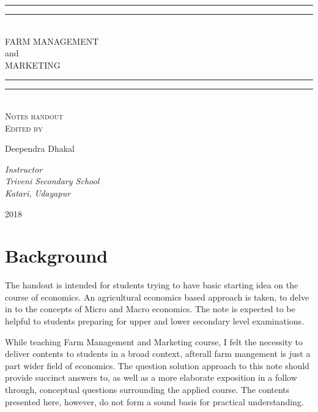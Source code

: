 \documentclass[11pt,]{book}
\title{}
\author{}
\date{}
\newlength{\drop}
\theoremstyle{definition}
\theoremstyle{definition}
\theoremstyle{definition}
\theoremstyle{remark}
\begin{document}
\begin{titlepage}
	\textheight
	\centering
	\vspace*{\baselineskip}
	\rule{\textwidth}{1.6pt}\vspace*{-\baselineskip}\vspace*{2pt}
	\rule{\textwidth}{0.4pt}\\[\baselineskip]
	{\Large FARM MANAGEMENT\\[1.2\baselineskip] and \\[1.2\baselineskip] MARKETING}\\[1.2\baselineskip]
	\rule{\textwidth}{0.4pt}\vspace*{-\baselineskip}\vspace{3.2pt}
	\rule{\textwidth}{1.6pt}\\[\baselineskip]
	\scshape
	Notes handout \\ %
	\vspace*{3\baselineskip}
	Edited by \\[\baselineskip]
	{\Large Deependra Dhakal\par} %
	{\itshape Instructor \\ Triveni Secondary School \\ Katari, Udayapur\par} %
	\vfill
	{\scshape 2018} \\
\end{titlepage}

{
\setcounter{tocdepth}{2}
\tableofcontents
}
\chapter*{Background}\label{background}

The handout is intended for students trying to have basic starting idea
on the course of economics. An agricultural economics based approach is
taken, to delve in to the concepts of Micro and Macro economics. The
note is expected to be helpful to students preparing for upper and lower
secondary level examinations.

While teaching Farm Management and Marketing course, I felt the
necessity to deliver contents to students in a broad context, afterall
farm mangement is just a part wider field of economics. The question
solution approach to this note should provide succinct answers to, as
well as a more elaborate exposition in a follow through, conceptual
questions surrounding the applied course. The contents presented here,
however, do not form a sound basis for practical understanding.
\end{document}
